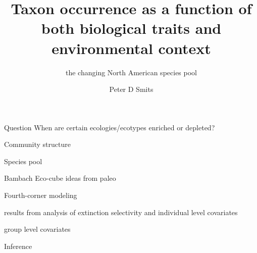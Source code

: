 \documentclass{beamer}
\title{Taxon occurrence as a function of both biological traits and environmental context}
\subtitle{the changing North American species pool}
\author{Peter D Smits}
\institute{Committee on Evolutionary Biology, University of Chicago}
\date{}
\begin{document}
\begin{frame}
  \maketitle
\end{frame}


\begin{frame}
  \begin{alertblock}{Question}
    When are certain ecologies/ecotypes enriched or depleted?
  \end{alertblock}
\end{frame}

\begin{frame}
  Community structure
\end{frame}

\begin{frame}
  Species pool  
\end{frame}

\begin{frame}
  Bambach Eco-cube ideas from paleo
\end{frame}

\begin{frame}
  Fourth-corner modeling
\end{frame}


\begin{frame}
  results from analysis of extinction selectivity and individual level covariates
\end{frame}

\begin{frame}
  group level covariates
\end{frame}

\begin{frame}
  Inference
\end{frame}

\end{document}
